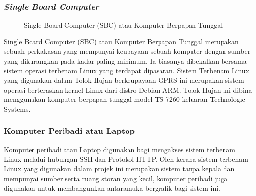 \subsubsection{\textit{Single Board Computer}}

\begin{figure}[!h]
\caption[Single Board Computer (SBC) atau Komputer Berpapan Tunggal]{Single Board Computer (SBC) atau Komputer Berpapan Tunggal}
\label{c2:f7}
\end{figure}

\newpage

Single Board Computer (SBC) atau Komputer Berpapan Tunggal merupakan sebuah perkakasan yang mempunyai keupayaan sebuah komputer dengan sumber yang dikurangkan pada kadar paling minimum. Ia biasanya dibekalkan bersama sistem operasi terbenam Linux yang terdapat dipasaran. Sistem Terbenam Linux yang digunakan dalam Tolok Hujan berkeupayaan GPRS ini merupakan sistem operasi berteraskan kernel Linux dari distro Debian-ARM. Tolok Hujan ini dibina menggunakan komputer berpapan tunggal model TS-7260 keluaran Technologic Systems. 

\subsubsection{Komputer Peribadi atau Laptop}
Komputer peribadi atau Laptop digunakan bagi mengakses sistem terbenam Linux melalui hubungan SSH dan Protokol HTTP. Oleh kerana sistem terbenam Linux yang digunakan dalam projek ini merupakan sistem tanpa kepala dan mempunyai sumber serta ruang storan yang kecil, komputer peribadi juga digunakan untuk membangunkan antaramuka bergrafik bagi sistem ini.

